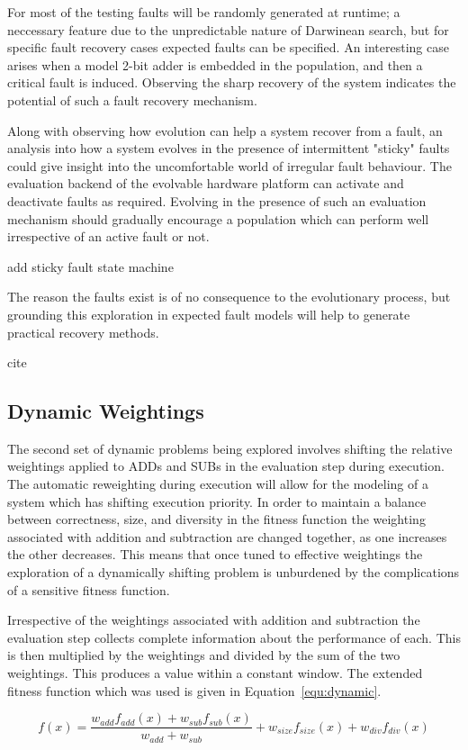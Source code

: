 For most of the testing faults will be randomly generated at runtime; a neccessary
feature due to the unpredictable nature of Darwinean search, but for specific
fault recovery cases expected faults can be specified. An interesting case arises when
a model 2-bit adder is embedded in the population, and then a critical fault is
induced. Observing the sharp recovery of the system indicates the potential of
such a fault recovery mechanism.

Along with observing how evolution can help a system recover from a fault, an
analysis into how a system evolves in the presence of intermittent "sticky"
faults could give insight into the uncomfortable world of irregular fault behaviour.
The evaluation backend of the evolvable hardware platform can activate and
deactivate faults as required. Evolving in the presence of such an evaluation
mechanism should gradually encourage a population which can perform well
irrespective of an active fault or not.

\todo add sticky fault state machine

The reason the faults exist is of no consequence to the evolutionary process,
but grounding this exploration in expected fault models will help to generate
practical recovery methods.

\todo cite

\subsection{Dynamic Weightings}
The second set of dynamic problems being explored involves shifting the relative
weightings applied to ADDs and SUBs in the evaluation step during execution. The
automatic reweighting during execution will allow for the modeling of a system
which has shifting execution priority. In order to maintain a balance between
correctness, size, and diversity in the fitness function the weighting associated
with addition and subtraction are changed together, as one increases the other
decreases. This means that once tuned to effective weightings the exploration of
a dynamically shifting problem is unburdened by the complications of a sensitive
fitness function.

Irrespective of the weightings associated with addition and subtraction the
evaluation step collects complete information about the performance of each.
This is then multiplied by the weightings and divided by the sum of the two
weightings. This produces a value within a constant window. The extended fitness
function which was used is given in Equation~\ref{equ:dynamic}.

\begin{equation}
	\label{equ:dynamic}
	f(x) = \frac{w_{add} f_{add}(x) + w_{sub} f_{sub}(x)}{w_{add} + w_{sub}} + w_{size} f_{size}(x) +
	w_{div} f_{div}(x)
\end{equation}
